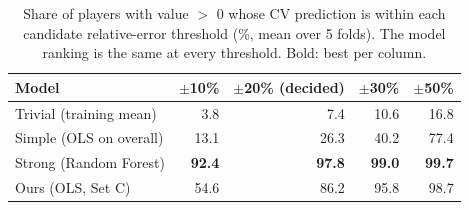 \begin{table}[t]
\centering
\small
\begin{tabular}{lrrrr}
\toprule
Model & $\pm$10\% & $\pm$20\% (decided) & $\pm$30\% & $\pm$50\% \\
\midrule
Trivial (training mean) & 3.8 & 7.4 & 10.6 & 16.8 \\
Simple (OLS on overall) & 13.1 & 26.3 & 40.2 & 77.4 \\
Strong (Random Forest) & \textbf{92.4} & \textbf{97.8} & \textbf{99.0} & \textbf{99.7} \\
Ours (OLS, Set C) & 54.6 & 86.2 & 95.8 & 98.7 \\
\bottomrule
\end{tabular}
\caption{Share of players with value $>$ 0 whose CV prediction is within each candidate relative-error threshold (\%, mean over 5 folds). The model ranking is the same at every threshold. Bold: best per column.}
\label{tab:threshold_sensitivity}
\end{table}
